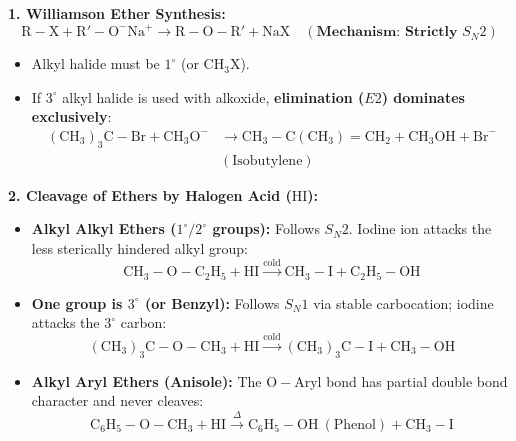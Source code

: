 \documentclass[10pt,twoside,openright]{book}
\begin{document}
\begin{formulabox}
\textbf{1. Williamson Ether Synthesis:}
\begin{equation}
  \mathrm{R-X} + \mathrm{R'-O}^-\mathrm{Na}^+ \longrightarrow \mathrm{R-O-R'} + \mathrm{NaX} \quad (\textbf{Mechanism: Strictly } S_N2)
\end{equation}
\begin{itemize}
  \item Alkyl halide must be $1^\circ$ (or $\mathrm{CH_3X}$).
  \item If $3^\circ$ alkyl halide is used with alkoxide, \textbf{elimination ($E2$) dominates exclusively}:
  \begin{align}
    (\mathrm{CH_3})_3\mathrm{C-Br} + \mathrm{CH_3O^-} &\longrightarrow \mathrm{CH_3-C(CH_3)=CH_2} + \mathrm{CH_3OH} + \mathrm{Br}^- \\
    &(\text{Isobutylene})
  \end{align}
\end{itemize}
\textbf{2. Cleavage of Ethers by Halogen Acid ($\mathrm{HI}$):}
\begin{itemize}
  \item \textbf{Alkyl Alkyl Ethers ($1^\circ / 2^\circ$ groups):} Follows $S_N2$. Iodine ion attacks the less sterically hindered alkyl group:
  \begin{equation}
    \mathrm{CH_3-O-C_2H_5} + \mathrm{HI} \xrightarrow{\text{cold}} \mathrm{CH_3-I} + \mathrm{C_2H_5-OH}
  \end{equation}
  \item \textbf{One group is $3^\circ$ (or Benzyl):} Follows $S_N1$ via stable carbocation; iodine attacks the $3^\circ$ carbon:
  \begin{equation}
    \mathrm{(CH_3)_3C-O-CH_3} + \mathrm{HI} \xrightarrow{\text{cold}} \mathrm{(CH_3)_3C-I} + \mathrm{CH_3-OH}
  \end{equation}
  \item \textbf{Alkyl Aryl Ethers (Anisole):} The $\mathrm{O-Aryl}$ bond has partial double bond character and never cleaves:
  \begin{equation}
    \mathrm{C_6H_5-O-CH_3} + \mathrm{HI} \xrightarrow{\Delta} \mathrm{C_6H_5-OH} \ (\text{Phenol}) + \mathrm{CH_3-I}
  \end{equation}
\end{itemize}
\end{formulabox}
\end{document}

